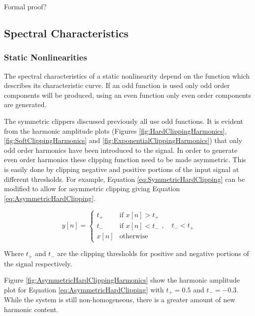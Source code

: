 			\note
			{
				Formal proof?
			}

	\subsection{Spectral Characteristics}
	\label{sec:ExcitationEvaluation-Comparison-SpectralCharacteristics}
		\subsubsection*{Static Nonlinearities}
			The spectral characteristics of a static nonlinearity depend on the function which describes its
			characteristic curve. If an odd function is used only odd order components will be produced, using
			an even function only even order components are generated. 

			The symmetric clippers discussed previously all use odd functions. It is evident from the harmonic
			amplitude plots (Figures \ref{fig:HardClippingHarmonics}, \ref{fig:SoftClippingHarmonics} and
			\ref{fig:ExponentialClippingHarmonics}) that only odd order harmonics have been introduced to the
			signal. In order to generate even order harmonics these clipping function need to be made
			asymmetric. This is easily done by clipping negative and positive portions of the input signal at
			different thresholds. For example, Equation \ref{eq:SymmetricHardClipping} can be modified to allow
			for asymmetric clipping giving Equation \ref{eq:AsymmetricHardClipping}.
			
			\begin{equation}
				y[n] = \begin{cases}
					t_{+} & \text{if $x[n] > t_{+}$} \\
					t_{-} & \text{if $x[n] < t_{-}$} \\
					x[n] & \text{otherwise}
				\end{cases}, \quad t_{-} < t_{+}
				\label{eq:AsymmetricHardClipping}
			\end{equation}

			Where $t_{+}$ and $t_{-}$ are the clipping thresholds for positive and negative portions of the
			signal respectively.	

			Figure \ref{fig:AsymmetricHardClippingHarmonics} show the harmonic amplitude plot for Equation
			\ref{eq:AsymmetricHardClipping} with $t_{+} = 0.5$ and $t_{-} = -0.3$. While the system is still
			non-homogeneous, there is a greater amount of new harmonic content.

